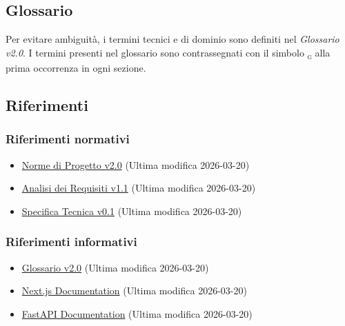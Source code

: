 \documentclass[a4paper, 11pt, oneside]{scrartcl}
\begin{document}
\subsection{Glossario}
Per evitare ambiguit\`a, i termini tecnici e di dominio sono definiti nel \textit{Glossario v2.0}.
I termini presenti nel glossario sono contrassegnati con il simbolo \textsubscript{\textsc{g}} alla prima occorrenza in ogni sezione.

\subsection{Riferimenti}

\subsubsection{Riferimenti normativi}
\begin{itemize}
    \item \href{https://swenightpro.github.io/Documentazione/docs/RTB/Documentazione%20Interna/Norme_di_Progetto_v2.0.pdf}{Norme di Progetto v2.0} (Ultima modifica 2026-03-20)
    \item \href{https://swenightpro.github.io/Documentazione/docs/RTB/Documentazione%20Esterna/Analisi_dei_Requisiti_v1.1.pdf}{Analisi dei Requisiti v1.1} (Ultima modifica 2026-03-20)
    \item \href{https://swenightpro.github.io/Documentazione/docs/PB/Documentazione%20Esterna/Specifica_Tecnica_v0.1.pdf}{Specifica Tecnica v0.1} (Ultima modifica 2026-03-20)
\end{itemize}

\subsubsection{Riferimenti informativi}
\begin{itemize}
    \item \href{https://swenightpro.github.io/Documentazione/docs/RTB/Documentazione%20Esterna/Glossario_v2.0.pdf}{Glossario v2.0} (Ultima modifica 2026-03-20)
    \item \href{https://nextjs.org/docs}{Next.js Documentation} (Ultima modifica 2026-03-20)
    \item \href{https://fastapi.tiangolo.com/}{FastAPI Documentation} (Ultima modifica 2026-03-20)
\end{itemize}

\newpage
\end{document}
